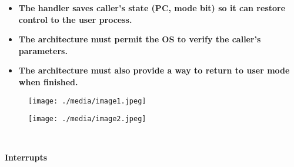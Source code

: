 \documentclass[12pt]{article}
\begin{document}
\begin{itemize}
	\item {\fontsize{16pt}{19.2pt}\selectfont \textbf{The handler saves caller’s state (PC, mode bit) so it can restore control to the user process.}\par}\par

	\item {\fontsize{16pt}{19.2pt}\selectfont \textbf{The architecture must permit the OS to verify the caller’s parameters.}\par}\par

	\item {\fontsize{16pt}{19.2pt}\selectfont \textbf{The architecture must also provide a way to return to user mode when finished.}\par}
\end{itemize}\par




\begin{figure}[H]
\advance\leftskip 0.23in		\texttt{[image: ./media/image1.jpeg]}
\end{figure}



\par




\begin{figure}[H]
\advance\leftskip -0.26in		\texttt{[image: ./media/image2.jpeg]}
\end{figure}



{\fontsize{16pt}{19.2pt}\selectfont \textbf{\ \ \ \ \ \ \ \ \ \ \ \ \ \ \ \ \ \ \ \ \ \ \ \ \ \ \ \ \ \ \ \ \ \ \ \ \ \ \ \ \ \ \ \  }\par}\par


\vspace{\baselineskip}

\vspace{\baselineskip}

\vspace{\baselineskip}
\begin{Center}
{\fontsize{24pt}{28.8pt}\selectfont \textbf{Interrupts}\par}
\end{Center}\par
\end{document}
